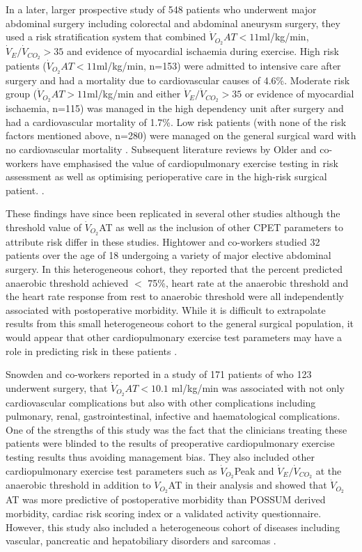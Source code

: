 In a later, larger prospective study of 548 patients who underwent major abdominal surgery including colorectal and abdominal aneurysm surgery, they used a risk stratification system that combined $\dot{V}_{O_2}AT<11$ml/kg/min, $\dot{V}_E/\dot{V}_{CO_2}>35$ and evidence of myocardial ischaemia during exercise. 
High risk patients ($\dot{V}_{O_2}AT<11$ml/kg/min, n=153) were admitted to intensive care after surgery and had a mortality due to cardiovascular causes of 4.6\%. 
Moderate risk group ($\dot{V}_{O_2}AT>11$ml/kg/min and either $\dot{V}_E/\dot{V}_{CO_2}>35$ or evidence of myocardial ischaemia, n=115) was managed in the high dependency unit after surgery and had a cardiovascular mortality of 1.7\%. 
Low risk patients (with none of the risk factors mentioned above, n=280) were managed on the general surgical ward with no cardiovascular mortality \parencite{older_cardiopulmonary_1999}. 
Subsequent literature reviews by Older and co-workers have emphasised the value of cardiopulmonary exercise testing in risk assessment as well as optimising perioperative care in the high-risk surgical patient. \parencite{older_preoperative_2000, older_clinical_2004, older_preoperative_2005}. 

These findings have since been replicated in several other studies although the threshold value of $\dot{V}_{O_2}$AT as well as the inclusion of other CPET parameters to attribute risk differ in these studies. 
Hightower and co-workers studied 32 patients over the age of 18 undergoing a variety of major elective abdominal surgery. 
In this heterogeneous cohort, they reported that the percent predicted anaerobic threshold achieved $<$ 75\%, heart rate at the anaerobic threshold and the heart rate response from rest to anaerobic threshold were all independently associated with postoperative morbidity. 
While it is difficult to extrapolate results from this small heterogeneous cohort to the general surgical population, it would appear that other cardiopulmonary exercise test parameters may have a role in predicting risk in these patients \parencite{hightower_pilot_2010}. 

Snowden and co-workers reported in a study of 171 patients of who 123 underwent surgery, that $\dot{V}_{O_2}AT<10.1$ ml/kg/min was associated with not only cardiovascular complications but also with other complications including pulmonary, renal, gastrointestinal, infective and haematological complications. 
One of the strengths of this study was the fact that the clinicians treating these patients were blinded to the results of preoperative cardiopulmonary exercise testing results thus avoiding management bias. 
They also included other cardiopulmonary exercise test parameters such as $\dot{V}_{O_2}$Peak and $\dot{V}_E/\dot{V}_{CO_2}$ at the anaerobic threshold in addition to $\dot{V}_{O_2}$AT in their analysis and showed that $\dot{V}_{O_2}$AT was more predictive of postoperative morbidity than POSSUM derived morbidity, cardiac risk scoring index or a validated activity questionnaire. 
However, this study also included a heterogeneous cohort of diseases including vascular, pancreatic and hepatobiliary disorders and sarcomas \parencite{snowden_submaximal_2010}. 

